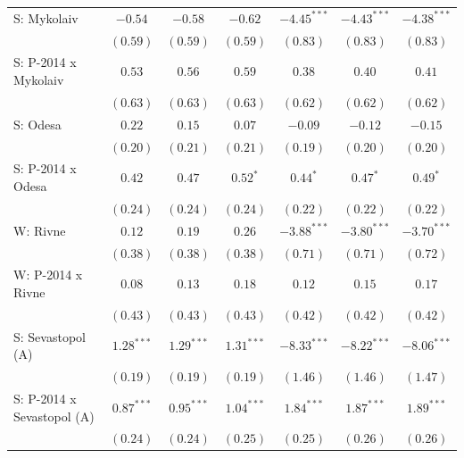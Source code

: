 \begin{table}
\begin{center}
\begin{small}
\begin{tabular}{l c c c c c c}
S: Mykolaiv                 & $-0.54$       & $-0.58$       & $-0.62$        & $-4.45^{***}$ & $-4.43^{***}$ & $-4.38^{***}$ \\
                            & $(0.59)$      & $(0.59)$      & $(0.59)$       & $(0.83)$      & $(0.83)$      & $(0.83)$      \\
S: P-2014 x Mykolaiv        & $0.53$        & $0.56$        & $0.59$         & $0.38$        & $0.40$        & $0.41$        \\
                            & $(0.63)$      & $(0.63)$      & $(0.63)$       & $(0.62)$      & $(0.62)$      & $(0.62)$      \\
S: Odesa                    & $0.22$        & $0.15$        & $0.07$         & $-0.09$       & $-0.12$       & $-0.15$       \\
                            & $(0.20)$      & $(0.21)$      & $(0.21)$       & $(0.19)$      & $(0.20)$      & $(0.20)$      \\
S: P-2014 x Odesa           & $0.42$        & $0.47$        & $0.52^{*}$     & $0.44^{*}$    & $0.47^{*}$    & $0.49^{*}$    \\
                            & $(0.24)$      & $(0.24)$      & $(0.24)$       & $(0.22)$      & $(0.22)$      & $(0.22)$      \\
W: Rivne                    & $0.12$        & $0.19$        & $0.26$         & $-3.88^{***}$ & $-3.80^{***}$ & $-3.70^{***}$ \\
                            & $(0.38)$      & $(0.38)$      & $(0.38)$       & $(0.71)$      & $(0.71)$      & $(0.72)$      \\
W: P-2014 x Rivne           & $0.08$        & $0.13$        & $0.18$         & $0.12$        & $0.15$        & $0.17$        \\
                            & $(0.43)$      & $(0.43)$      & $(0.43)$       & $(0.42)$      & $(0.42)$      & $(0.42)$      \\
S: Sevastopol (A)           & $1.28^{***}$  & $1.29^{***}$  & $1.31^{***}$   & $-8.33^{***}$ & $-8.22^{***}$ & $-8.06^{***}$ \\
                            & $(0.19)$      & $(0.19)$      & $(0.19)$       & $(1.46)$      & $(1.46)$      & $(1.47)$      \\
S: P-2014 x Sevastopol (A)  & $0.87^{***}$  & $0.95^{***}$  & $1.04^{***}$   & $1.84^{***}$  & $1.87^{***}$  & $1.89^{***}$  \\
                            & $(0.24)$      & $(0.24)$      & $(0.25)$       & $(0.25)$      & $(0.26)$      & $(0.26)$      \\

\end{tabular}
\end{small}
\end{center}
\end{table}
